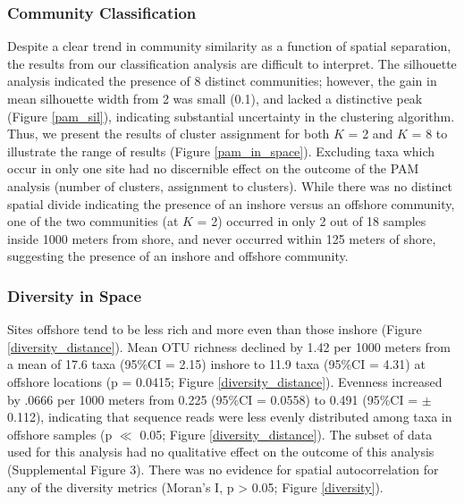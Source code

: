 \documentclass[11pt,letterpaper]{article} %
\begin{document}
\subsubsection*{Community Classification}
Despite a clear trend in community similarity as a function of spatial separation, the results from our classification analysis are difficult to interpret. The silhouette analysis indicated the presence of 8 distinct communities; however, the gain in mean silhouette width from 2 was small (0.1), and lacked a distinctive peak (Figure \ref{pam_sil}), indicating substantial uncertainty in the clustering algorithm. Thus, we present the results of cluster assignment for both $K$ = 2 and $K$ = 8 to illustrate the range of results (Figure \ref{pam_in_space}). Excluding taxa which occur in only one site had no discernible effect on the outcome of the PAM analysis (number of clusters, assignment to clusters). While there was no distinct spatial divide indicating the presence of an inshore versus an offshore community, one of the two communities (at $K$ = 2) occurred in only 2 out of 18 samples inside 1000 meters from shore, and never occurred within 125 meters of shore, suggesting the presence of an inshore and offshore community.

\subsubsection*{Diversity in Space}
Sites offshore tend to be less rich and more even than those inshore (Figure \ref{diversity_distance}). Mean OTU richness declined by 1.42 per 1000 meters from a mean of 17.6 taxa (95\%CI = 2.15) inshore to 11.9 taxa (95\%CI = 4.31) at offshore locations (p = 0.0415; Figure \ref{diversity_distance}). Evenness increased by .0666 per 1000 meters from 0.225 (95\%CI = 0.0558) to 0.491 (95\%CI = $\pm$ 0.112), indicating that sequence reads were less evenly distributed among taxa in offshore samples (p $\ll$ 0.05; Figure \ref{diversity_distance}).
The subset of data used for this analysis had no qualitative effect on the outcome of this analysis (Supplemental Figure 3).
There was no evidence for spatial autocorrelation for any of the diversity metrics (Moran's I, p > 0.05; Figure \ref{diversity}).
\end{document}
